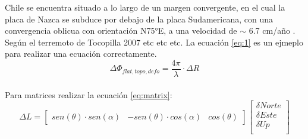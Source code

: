 \fontsize{14}{15}\selectfont
Chile se encuentra situado a lo largo de un margen convergente, en el cual la placa de Nazca se subduce por debajo de la placa Sudamericana, con una convergencia oblicua con orientación N75°E, a una velocidad de $\sim$ 6.7 cm/año \citep*{angermann_space-geodetic_1999,argus_geologically_2011}. Según \cite{bejar-pizarro_asperities_2010} el terremoto de Tocopilla 2007 etc etc etc. La ecuación \eqref{eq:1} es un ejmeplo para realizar una ecuación correctamente.\\
\begin{equation}
	\Delta \Phi_{flat,topo,defo} = \dfrac{4\pi}{\lambda}\cdot\Delta R
	\label{eq:1}
\end{equation}\\
Para matrices realizar la ecuación \eqref{eq:matrix}:\\
\begin{equation}
	\Delta L= \begin{bmatrix}
		sen(\theta)\cdot sen(\alpha) & -sen(\theta)\cdot cos(\alpha) & cos(\theta)
	\end{bmatrix}
	\begin{bmatrix}
		\delta Norte\\
		\delta Este\\
		\delta Up\\
	\end{bmatrix}
	\label{eq:matrix}
\end{equation}\\